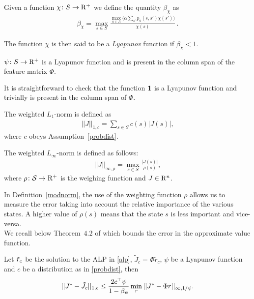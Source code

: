\begin{definition}
Given a function $\chi\colon S\rightarrow \mathrm{R}^+$ we define the quantity $\beta_{\chi}$ as
\begin{align*}
\beta_{\chi}=\max_{s \in S} \frac{\underset{a \in A}{\max}\big(\alpha\sum_{s'}p_a(s,s')\chi(s')\big)}{\chi(s)}\,.
\end{align*}
\end{definition}
\begin{definition}
The function $\chi$ is then said to be a \emph{Lyapunov} function if $\beta_{\chi}<1$.
\end{definition}
\begin{assumption}\label{lyap}
$\psi\colon S \rightarrow \mathrm{R}^+$ is a Lyapunov function and is present in the column span of the feature matrix $\Phi$.
\end{assumption}
It is straightforward to check that the function $\mathbf{1}$ is a Lyapunov function and trivially is present in the column span of $\Phi$. 
\begin{definition}\label{modlone}
The weighted $L_1$-norm is defined as 
\begin{align*}
||J||_{1,c}=\sum_{s \in S} c(s)|J(s)|,
\end{align*}
where $c$ obeys Assumption~\ref{probdist}.
\end{definition}
\begin{definition}\label{modnorm}
The weighted $L_\infty$-norm is defined as follows:  
\begin{align*}
||J||_{\infty,\rho}=\max_{s \in S} \frac{|J(s)|}{\rho(s)},
\end{align*}
where $\rho \colon \mathcal{S} \rightarrow \mathrm{R}^+$ is the weighing function and $J\in \mathrm{R}^n$.
\end{definition}
In Definition~\ref{modnorm}, the use of the weighting function $\rho$ allows us to measure the error taking into account the relative importance of the various states. A higher value of $\rho(s)$ means that the state $s$ is less important and vice-versa.\\
We recall below Theorem~$4.2$ of \cite{ALP} which bounds the error in the approximate value function.
\begin{theorem}\label{restateval}
Let $\tilde{r}_c$ be the solution to the ALP in \eqref{alp}, $\tilde{J}_c=\Phi \tilde{r}_c$, $\psi$ be a Lyapunov function and $c$ be a distribution as in \eqref{probdist}, then 
\begin{align*}
||J^*-\tilde{J}_c||_{1,c}\leq \frac{2c^\top \psi}{1-\beta_{\psi}}\min_{r}||J^*-\Phi r||_{\infty,1/\psi}.
\end{align*}
\end{theorem}
